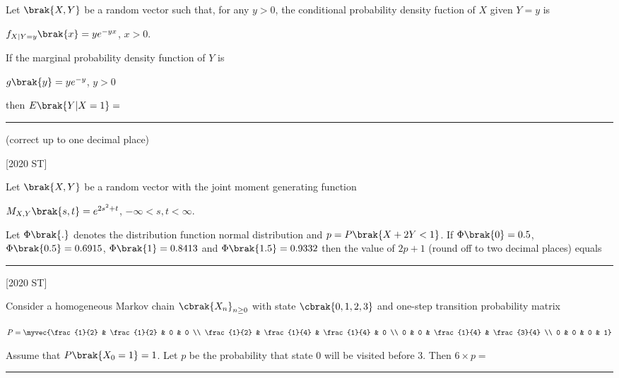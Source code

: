 \iffalse
\title{2020-ST-53-65}
\author{EE24BTECH11010 - BALAJI B}
\section{st}
\chapter{2020}
\fi


    \item Let $\brak{X,Y}$ be a random vector such that, for any $ y > 0$, the conditional probability density fuction of $X$ given $Y = y$ is 
    \begin{center}
        $f_{X|Y=y}\brak{x} = ye^{-yx}$, $x > 0.$
    \end{center}
    If the marginal probability density function of $Y$ is 
    \begin{center}
        $g\brak{y} = ye^{-y}$, $y > 0$
    \end{center}
    then $E\brak{Y|X=1} = $ \rule{2cm}{0.4pt} (correct up to one decimal place)

    \hfill [2020 ST]
    \item Let $\brak{X,Y}$ be a random vector with the joint moment generating function 
    \begin{center}
        $M_{X,Y}\brak{s,t} = e^{2s^2 + t}$, $-\infty < s,t < \infty$.
    \end{center}
    Let $\Phi\brak{.}$ denotes the distribution function normal distribution and $p = P\brak{X + 2Y < 1}$. If $\Phi \brak{0} = 0.5$, $\Phi\brak{0.5} = 0.6915$, $\Phi\brak{1} = 0.8413$ and $\Phi \brak{1.5} = 0.9332$ then the value of $2p + 1$ (round off to two decimal places) equals \rule{2cm}{0.4pt}

    \hfill [2020 ST]
    \item Consider a homogeneous Markov chain $\cbrak{X_n}_{n \geq 0}$ with state $\cbrak{0,1,2,3}$ and one-step transition probability matrix 
    \begin{center}
        $P = \myvec{\frac{1}{2} & \frac{1}{2} & 0 & 0 \\ \frac{1}{2} & \frac{1}{4} & \frac{1}{4} & 0 \\
        0 & 0 & \frac{1}{4} & \frac{3}{4} \\ 0 & 0 & 0 & 1}$
    \end{center}
    Assume that $P\brak{X_0 = 1} = 1$. Let $p$ be the probability that state 0 will be visited before 3. Then $6 \times p = $ \rule{2cm}{0.4pt}

